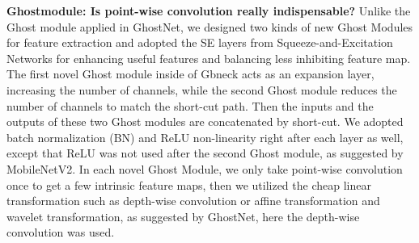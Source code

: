 {\textbf{Ghostmodule: Is point-wise convolution really indispensable?} Unlike the Ghost module applied in GhostNet\cite{19}, we designed two kinds of new Ghost Modules for feature extraction and adopted the SE layers from Squeeze-and-Excitation Networks \cite{24} for enhancing useful features and balancing less inhibiting feature map. The first novel Ghost module inside of Gbneck acts as an expansion layer, increasing the number of channels, while the second Ghost module reduces the number of channels to match the short-cut path. Then the inputs and the outputs of these two Ghost modules are concatenated by short-cut. We adopted batch normalization (BN) and ReLU non-linearity right after each layer as well\cite{19}, except that ReLU was not used after the second Ghost module, as suggested by MobileNetV2\cite{30}. In each novel Ghost Module, we only take point-wise convolution once to get a few intrinsic feature maps, then we utilized the cheap linear transformation such as depth-wise convolution or affine transformation and wavelet transformation, as suggested by GhostNet\cite{19}, here the depth-wise convolution was used.

}
